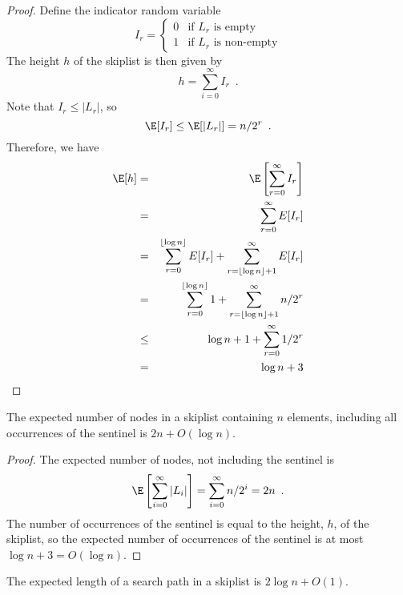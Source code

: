 \begin{proof}
  Define the indicator random variable
  \[ I_r = \left\{\begin{array}{ll}
     0 & \mbox{if $L_r$ is empty} \\
     1 & \mbox{if $L_r$ is non-empty}
     \end{array}\right.
  \]
  The height $h$ of the skiplist is then given by
  \[
       h = \sum_{i=0}^\infty I_r \enspace .
  \]
  Note that $I_r \le |L_r|$, so 
  \[
     \E[I_r] \le \E[|L_r|] = n/2^r \enspace .
  \]
  Therefore, we have
  \begin{eqnarray*}
       \E[h] &=& \E\left[\sum_{r=0}^\infty I_r\right] \\
        &=& \sum_{r=0}^{\infty} E[I_r] \\
        &=& \sum_{r=0}^{\lfloor\log n\rfloor} E[I_r]
                 + \sum_{r=\lfloor\log n\rfloor+1}^{\infty} E[I_r]  \\
        &=& \sum_{r=0}^{\lfloor\log n\rfloor} 1
                 + \sum_{r=\lfloor\log n\rfloor+1}^{\infty} n/2^r \\
        &\le& \log n + 1
                 + \sum_{r=0}^\infty 1/2^r \\
        &=& \log n + 3
  \end{eqnarray*}
\end{proof}

\begin{lem}
  The expected number of nodes in a skiplist containing $n$ elements,
  including all occurrences of the sentinel is $2n+O(\log n)$.
\end{lem}

\begin{proof}
The expected number of nodes, not including the sentinel is 
\[
  \E\left[\sum_{i=0}^{\infty} |L_i|\right] = 
  \sum_{i=0}^{\infty} n/2^i = 2n \enspace .
\]
The number of occurrences of the sentinel is equal to the height, $h$,
of the skiplist, so the expected number of occurrences of the sentinel
is at most $\log n+3 = O(\log n)$.
\end{proof}

\begin{lem}
The expected length of a search path in a skiplist is $2\log n + O(1)$.
\end{lem}

